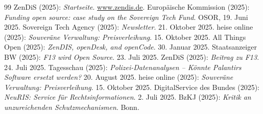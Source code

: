 \documentclass[12pt,a4paper]{article}
\begin{document}
\begin{thebibliography}{99}
		 ZenDiS (2025): \emph{Startseite}. \url{www.zendis.de}.
		 Europäische Kommission (2025): \emph{Funding open source: case study on the Sovereign Tech Fund}. OSOR, 19. Juni 2025.
		 Sovereign Tech Agency (2025): \emph{Newsletter}. 21. Oktober 2025.
		 heise online (2025): \emph{Souveräne Verwaltung: Preisverleihung}. 15. Oktober 2025.
		 All Things Open (2025): \emph{ZenDIS, openDesk, and openCode}. 30. Januar 2025.
		 Staatsanzeiger BW (2025): \emph{F13 wird Open Source}. 23. Juli 2025.
		 ZenDiS (2025): \emph{Beitrag zu F13}. 24. Juli 2025.
		 Tagesschau (2025): \emph{Polizei-Datenanalysen – Könnte Palantirs Software ersetzt werden?} 20. August 2025.
		 heise online (2025): \emph{Souveräne Verwaltung: Preisverleihung}. 15. Oktober 2025.
		 DigitalService des Bundes (2025): \emph{NeuRIS: Service für Rechtsinformationen}. 2. Juli 2025.
		 BzKJ (2025): \emph{Kritik an unzureichenden Schutzmechanismen}. Bonn.
		
	\end{thebibliography}
	
\end{document}
